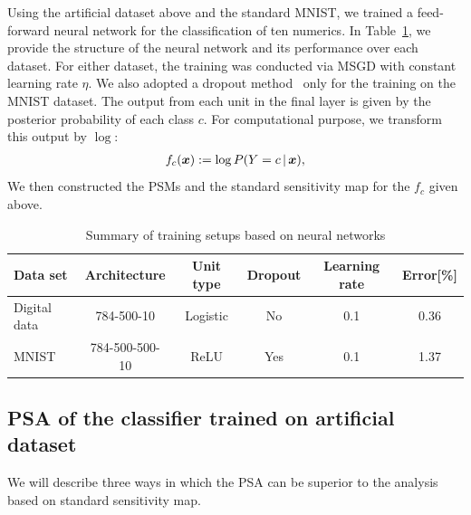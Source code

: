 Using the artificial dataset above and the standard MNIST, we trained a feed-forward neural
network for the classification of ten numerics.
%
In Table~\ref{tab:NN_specification}, we provide the structure of the neural network and its performance over
each dataset.
%
For either dataset, the training was conducted via MSGD with constant
learning rate $\eta$.
%
%
We also adopted a dropout method~\cite{Hinton2012} only for the training
on the MNIST dataset.
%
The output from each unit in the final layer is given by the posterior
probability of each class $c$.
%
For computational purpose, we transform this output by $\log$:
%
\begin{align}
 f_{c}(\mbox{\boldmath $x$}) := \log P(Y = c \,|\, \mbox{\boldmath $x$}),
\end{align}
%
We then constructed the PSMs and the standard sensitivity map for the $f_c$
given above.
\begin{table}[htbp]
 \caption{Summary of training setups based on neural networks}
 \centering
 \begin{tabular}{lccccc}
  \hline
  \textbf{Data set} & \textbf{Architecture} & \textbf{Unit type} & \textbf{Dropout}
  & \textbf{Learning rate} & \textbf{Error[\%]} \\
  \hline
  Digital data & 784-500-10 & Logistic & No & 0.1 & 0.36  \\
  MNIST & 784-500-500-10 & ReLU & Yes &  0.1 & 1.37 \\
  \hline
 \end{tabular}
 \label{tab:NN_specification}
\end{table}

\subsection{PSA of the classifier trained on artificial dataset}
\label{sec:psa_art}
%
We will describe three ways in which the PSA can be superior to the
analysis based on standard sensitivity map.

